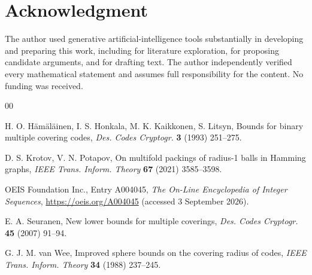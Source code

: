 \documentclass[10pt,a4paper]{article}
\begin{document}
\section*{Acknowledgment}

The author used generative artificial-intelligence tools substantially in
developing and preparing this work, including for literature exploration, for
proposing candidate arguments, and for drafting text. The author independently
verified every mathematical statement and assumes full responsibility for the
content. No funding was received.

\footnotesize

\begin{thebibliography}{00}

 H. O. H\"am\"al\"ainen, I. S. Honkala, M. K. Kaikkonen, S. Litsyn, Bounds for binary multiple covering codes, {\it Des. Codes Cryptogr.} {\bf 3} (1993) 251--275.

 D. S. Krotov, V. N. Potapov, On multifold packings of radius-1 balls in Hamming graphs, {\it IEEE Trans. Inform. Theory} {\bf 67} (2021) 3585--3598.

 OEIS Foundation Inc., Entry A004045, {\it The On-Line Encyclopedia of Integer Sequences}, \underline{https://oeis.org/A004045} (accessed 3 September 2026).

 E. A. Seuranen, New lower bounds for multiple coverings, {\it Des. Codes Cryptogr.} {\bf 45} (2007) 91--94.

 G. J. M. van Wee, Improved sphere bounds on the covering radius of codes, {\it IEEE Trans. Inform. Theory} {\bf 34} (1988) 237--245.

\end{thebibliography}
\end{document}
